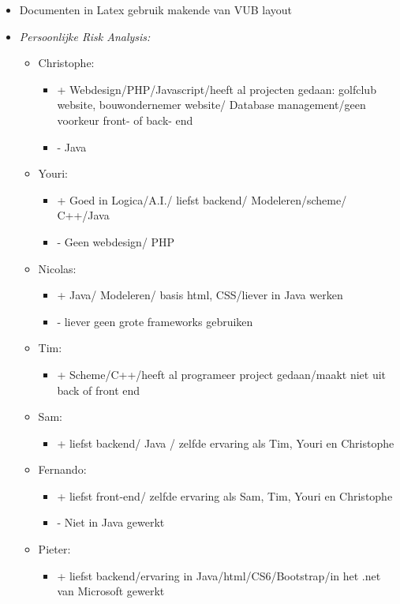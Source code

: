 \begin{itemize}
	\item Documenten in Latex gebruik makende van VUB layout
	\item \textit{Persoonlijke Risk Analysis:}
		\begin{itemize}	
			\item Christophe: 
			 \begin{itemize}
			 	\item + Webdesign/PHP/Javascript/heeft al projecten gedaan: golfclub website, bouwondernemer website/ Database management/geen voorkeur front- of back- end
			 	\item - Java
			 \end{itemize} 		 
			 \item Youri:
			 \begin{itemize}
			 	\item + Goed in Logica/A.I./ liefst backend/ Modeleren/scheme/ C++/Java
			 	\item - Geen webdesign/ PHP
			 \end{itemize}		 
			 \item Nicolas:
			 \begin{itemize}
			 	\item + Java/ Modeleren/ basis html, CSS/liever in Java werken
			 	\item - liever geen grote frameworks gebruiken
			 \end{itemize}		 
			 \item Tim:
			 \begin{itemize}
			 	\item + Scheme/C++/heeft al programeer project gedaan/maakt niet uit back of front end
			 \end{itemize}		 
			 \item Sam:
			 \begin{itemize}
			 	\item + liefst backend/ Java / zelfde ervaring als Tim, Youri en Christophe
			 \end{itemize}		 
			 \item Fernando:
			 \begin{itemize}
			 	\item + liefst front-end/ zelfde ervaring als Sam, Tim, Youri en Christophe
			 	\item - Niet in Java gewerkt
			 \end{itemize}		 
			 \item Pieter:
			 \begin{itemize}
			 	\item + liefst backend/ervaring in Java/html/CS6/Bootstrap/in het .net van Microsoft gewerkt

\end{itemize}
\end{itemize}
\end{itemize}
